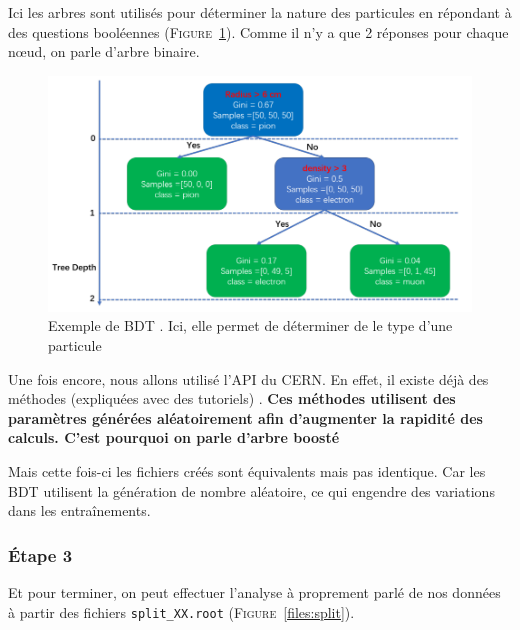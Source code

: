 \documentclass[10pt,a4paper]{report}
\begin{document}
Ici les arbres sont utilisés pour déterminer la nature des particules en répondant à des questions booléennes (\textsc{Figure}~\ref{ExampleBDT}). Comme il n'y a que 2 réponses pour chaque nœud, on parle d'arbre binaire. 

\begin{figure}[h!]
	\center
	\includegraphics[width=\textwidth]{../img/ExampleBDT.png}
	\caption{Exemple de BDT \cite{liu:tel-03405418}. Ici, elle permet de déterminer de le type d'une particule}
	\label{ExampleBDT}
\end{figure}

Une fois encore, nous allons utilisé l'API du CERN. En effet, il existe déjà des méthodes (expliquées avec des tutoriels) \cite{root:treeFriend}. \textbf{Ces méthodes utilisent des paramètres générées aléatoirement afin d'augmenter la rapidité des calculs. C'est pourquoi on parle d'arbre boosté}

Mais cette fois-ci les fichiers créés sont équivalents mais pas identique. Car les BDT utilisent la génération de nombre aléatoire, ce qui engendre des variations dans les entraînements.\\

\subsubsection{Étape 3}

Et pour terminer, on peut effectuer l'analyse à proprement parlé de nos données à partir des fichiers \texttt{split\_XX.root} (\textsc{Figure}~\ref{files:split}).


	



\end{document}
